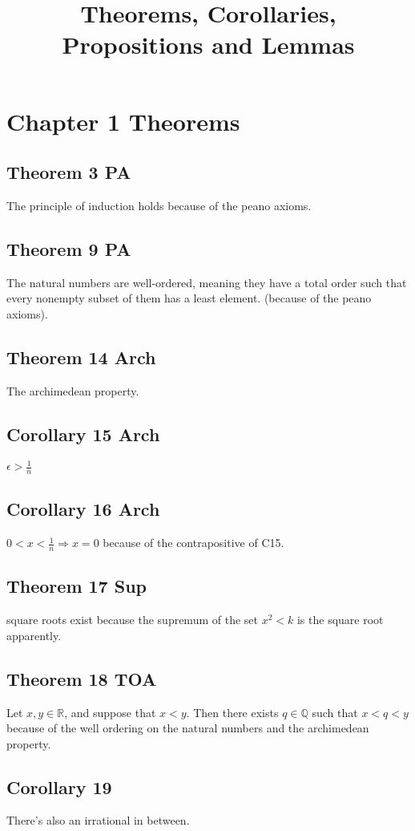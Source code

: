 \documentclass{article}
\title{Theorems, Corollaries, Propositions and Lemmas}
\begin{document}
\maketitle{}
\newpage{}
\section{Chapter 1 Theorems}
\subsection{Theorem 3 PA}
The principle of induction holds because of the peano axioms.
\subsection{Theorem 9 PA}
The natural numbers are well-ordered, meaning they have a total order
such that every nonempty subset of them has a least element.
(because of
the peano axioms).
\subsection{Theorem 14 Arch}
The archimedean property.

\subsection{Corollary 15 Arch}
$\epsilon>\frac{1}{n}$
\subsection{Corollary 16 Arch}
$0<x<\frac{1}{n} \Longrightarrow x = 0$ because of the contrapositive of C15.
\subsection{Theorem 17 Sup}
square roots exist because the supremum of the set $x^2<k$ is the square root apparently.

\subsection{Theorem 18 TOA}
Let $x,y \in \mathbb{R}$, and suppose that $x<y$. Then there exists
$q \in \mathbb{Q}$ such that $x<q<y$ because of the well ordering on the natural numbers
and the archimedean property.

\subsection{Corollary 19}
There's also an irrational in between.
\end{document}
